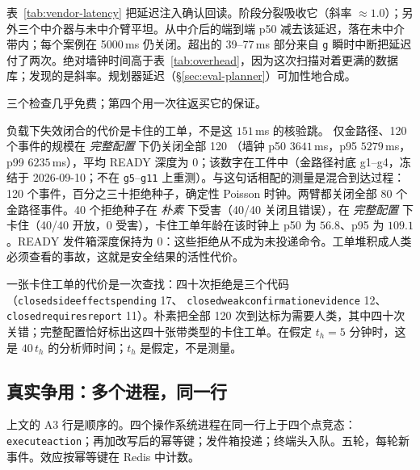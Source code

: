 \documentclass[acmsmall,manuscript,review,anonymous]{acmart}
\renewcommand{\_}{\discretionary{\textunderscore}{}{\textunderscore}}
\begin{document}
表~\ref{tab:vendor-latency} 把延迟注入确认回读。阶段分裂吸收它（斜率 $\approx 1.0$）；另外三个中介器与未中介臂平坦。从中介后的端到端 p50 减去该延迟，落在未中介带内；每个案例在 5000\,ms 仍关闭。超出的 39--77\,ms 部分来自 \texttt{g} 瞬时中断把延迟付了两次。绝对墙钟时间高于表~\ref{tab:overhead}，因为这次扫描对着更满的数据库；发现的是斜率。规划器延迟（\S\ref{sec:eval-planner}）可加性地合成。

三个检查几乎免费；第四个用一次往返买它的保证。

负载下失效闭合的代价是卡住的工单，不是这 $151$\,ms 的核验跳。
仅金路径、120 个事件的规模在 \emph{完整配置} 下仍关闭全部 120
（墙钟 p50 $3641$\,ms，p95 $5279$\,ms，p99 $6235$\,ms），平均 {READY} 深度为 $0$；该数字在工件中（金路径衬底 g1--g4，冻结于 2026-09-10；不在 \texttt{g5}--\texttt{g11} 上重测）。与这句话相配的测量是混合到达过程：120 个事件，百分之三十拒绝种子，确定性 {Poisson} 时钟。两臂都关闭全部 80 个金路径事件。40 个拒绝种子在 \emph{朴素} 下受害（40/40 关闭且错误），在 \emph{完整配置} 下卡住（40/40 开放，0 受害），卡住工单年龄在该时钟上 p50 为 $56.8$、p95 为 $109.1$。{READY} 发件箱深度保持为 0：这些拒绝从不成为未投递命令。工单堆积成人类必须查看的事故，这就是安全结果的活性代价。

一张卡住工单的代价是一次查找：四十次拒绝是三个代码
（\texttt{closed\_side\_effects\_pending} 17、
\texttt{closed\_weak\_confirmation\_evidence} 12、
\texttt{closed\_requires\_report} 11）。朴素把全部 120 次到达标为需要人类，其中四十次关错；完整配置恰好标出这四十张带类型的卡住工单。在假定 $t_h{=}5$ 分钟时，这是 $40\,t_h$ 的分析师时间；$t_h$ 是假定，不是测量。

\subsection{真实争用：多个进程，同一行}
\label{sec:eval-concurrency}

上文的 A3 行是顺序的。四个操作系统进程在同一行上于四个点竞态：\texttt{execute\_action}；再加改写后的幂等键；发件箱投递；终端头入队。五轮，每轮新事件。效应按幂等键在 Redis 中计数。
\end{document}
